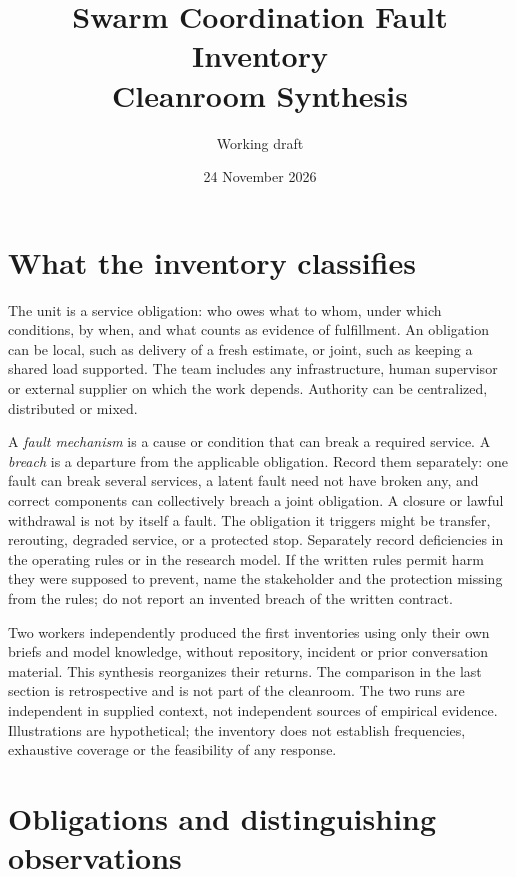 \documentclass[11pt]{article}
\title{Swarm Coordination Fault Inventory\\Cleanroom Synthesis}
\author{Working draft}
\date{24 November 2026}
\begin{document}
\maketitle

\section{What the inventory classifies}
The unit is a service obligation: who owes what to whom, under which conditions, by when, and what counts as evidence of fulfillment. An obligation can be local, such as delivery of a fresh estimate, or joint, such as keeping a shared load supported. The team includes any infrastructure, human supervisor or external supplier on which the work depends. Authority can be centralized, distributed or mixed.

A \emph{fault mechanism} is a cause or condition that can break a required service. A \emph{breach} is a departure from the applicable obligation. Record them separately: one fault can break several services, a latent fault need not have broken any, and correct components can collectively breach a joint obligation. A closure or lawful withdrawal is not by itself a fault. The obligation it triggers might be transfer, rerouting, degraded service, or a protected stop. Separately record deficiencies in the operating rules or in the research model. If the written rules permit harm they were supposed to prevent, name the stakeholder and the protection missing from the rules; do not report an invented breach of the written contract.

Two workers independently produced the first inventories using only their own briefs and model knowledge, without repository, incident or prior conversation material. This synthesis reorganizes their returns. The comparison in the last section is retrospective and is not part of the cleanroom. The two runs are independent in supplied context, not independent sources of empirical evidence. Illustrations are hypothetical; the inventory does not establish frequencies, exhaustive coverage or the feasibility of any response.

\section{Obligations and distinguishing observations}
\end{document}
